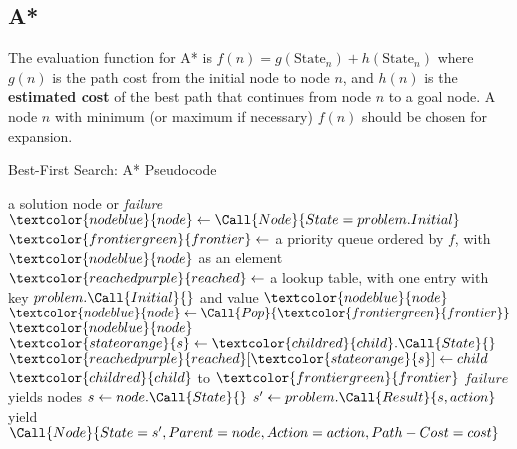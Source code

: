 \documentclass[exam={Midterm},color=true]{cs581exam}
\renewcommand{\emph}[1]{\textbf{#1}}
\begin{document}
\subsection{A*}\label{subsec:a*}
The evaluation function for A* is $f(n) = g(\mbox{State}_{n}) + h(\mbox{State}_{n})$ where $g(n)$ is the path cost from the initial node to node $n$,
and $h(n)$ is the \emph{estimated cost} of the best path that continues from node $n$ to a goal node.
A node $n$ with minimum (or maximum if necessary) $f(n)$ should be chosen for expansion.
\begin{algorithm}[H]
	\caption{Best-First Search: A* Pseudocode}\label{alg:a*}
	\begin{algorithmic}[1]
		 \Returns a solution node or \textit{failure}
			\State $\textcolor{nodeblue}{node}\gets\Call{Node}{State=problem.Initial}$
			\State $\textcolor{frontiergreen}{frontier}\gets$ a priority queue ordered by $f$, with $\textcolor{nodeblue}{node}$ as an element
			\State $\textcolor{reachedpurple}{reached}\gets$ a lookup table, with one entry with key $problem.\Call{Initial}{}$ and value $\textcolor{nodeblue}{node}$
				\State $\textcolor{nodeblue}{node}\gets\Call{Pop}{\textcolor{frontiergreen}{frontier}}$
					\Return $\textcolor{nodeblue}{node}$
				\EndIf
					\State $\textcolor{stateorange}{s}\gets \textcolor{childred}{child}.\Call{State}{}$
						\State $\textcolor{reachedpurple}{reached}[\textcolor{stateorange}{s}]\gets child$
						\State $\textcolor{childred}{child}$ to $\textcolor{frontiergreen}{frontier}$
					\EndIf
				\EndFor
			\EndWhile
			\State \Return $failure$
		\EndFunction
		 yields nodes
			\State $s\gets node.\Call{State}{}$
				\State $s'\gets problem.\Call{Result}{s, action}$
				\State {}
				\State yield $\Call{Node}{State=s', Parent=node, Action=action, Path-Cost=cost}$
			\EndFor
		\EndFunction
	\end{algorithmic}
\end{algorithm}
\end{document}
